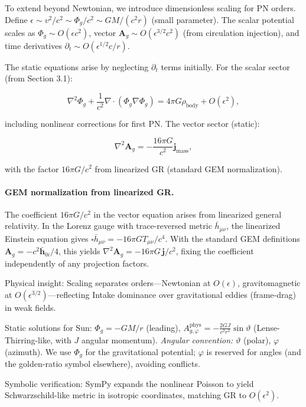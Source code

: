 To extend beyond Newtonian, we introduce dimensionless scaling for PN orders. Define $\epsilon \sim v^2 / c^2 \sim \Phi_g / c^2 \sim G M / (c^2 r)$ (small parameter). The scalar potential scales as $\Phi_g \sim O(\epsilon c^2)$, vector $\mathbf{A}_g \sim O(\epsilon^{3/2} c^2)$ (from circulation injection), and time derivatives $\partial_t \sim O(\epsilon^{1/2} c / r)$.

The static equations arise by neglecting $\partial_t$ terms initially. For the scalar sector (from Section 3.1):

\[
\nabla^2 \Phi_g + \frac{1}{c^2} \nabla \cdot (\Phi_g \nabla \Phi_g) = 4\pi G \rho_{\text{body}} + O(\epsilon^2),
\]

including nonlinear corrections for first PN. The vector sector (static):

\[
\nabla^2 \mathbf{A}_g = -\frac{16\pi G}{c^2} \mathbf{j}_{\text{mass}},
\]

with the factor $16\pi G/c^2$ from linearized GR (standard GEM normalization).

\paragraph{GEM normalization from linearized GR.}
The coefficient $16\pi G/c^2$ in the vector equation arises from linearized general relativity.
In the Lorenz gauge with trace-reversed metric $\bar{h}_{\mu\nu}$, the linearized Einstein
equation gives $\square\bar{h}_{\mu\nu} = -16\pi G T_{\mu\nu}/c^4$. With the standard GEM
definitions $\mathbf{A}_g = -c^2\bar{\mathbf{h}}_{0i}/4$, this yields
$\nabla^2\mathbf{A}_g = -16\pi G\,\mathbf{j}/c^2$, fixing the coefficient independently
of any projection factors.

Physical insight: Scaling separates orders—Newtonian at $O(\epsilon)$, gravitomagnetic at $O(\epsilon^{3/2})$—reflecting Intake dominance over gravitational eddies (frame-drag) in weak fields.

Static solutions for Sun: $\Phi_g = -G M / r$ (leading), $A_{g,\varphi}^{\text{phys}} = -\frac{2 G J}{c^{2} r^{2}} \sin \vartheta$ (Lense-Thirring-like, with $J$ angular momentum).
\noindent\emph{Angular convention:} $\vartheta$ (polar), $\varphi$ (azimuth). We use $\Phi_g$ for the gravitational potential; $\varphi$ is reserved for angles (and the golden-ratio symbol elsewhere), avoiding conflicts.

Symbolic verification: SymPy expands the nonlinear Poisson to yield Schwarzschild-like metric in isotropic coordinates, matching GR to $O(\epsilon^2)$.


